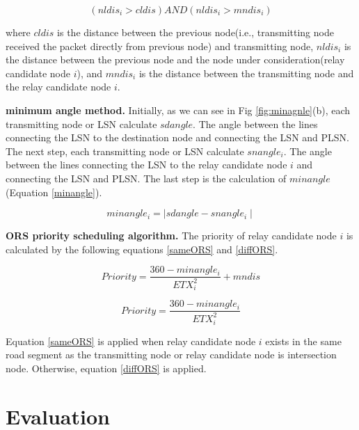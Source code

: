 \documentclass{comex}
\begin{document}
\begin{equation}
\label{potential nodes}
\left( nldis_i > cldis \right)   AND   \left( nldis_i > mndis_i \right) 
\end{equation}

where $cldis$ is the distance between the previous node(i.e., transmitting node received the packet directly from previous node) and transmitting node,
$nldis_i$ is the distance between the previous node and the node under consideration(relay candidate node $i$), and $mndis_i$ is the distance between the transmitting node and the relay candidate node $i$.


\textbf{minimum angle method.} Initially, as we can see in Fig \ref{fig:minagnle}(b), each transmitting node or LSN calculate $sdangle$. The angle between the lines connecting the LSN to the destination node and connecting the LSN and PLSN. The next step, each transmitting node or LSN calculate $snangle_i$. The angle between the lines connecting the LSN to the relay candidate node $i$  and connecting the LSN and PLSN. The last step is the calculation of  $minangle$ (Equation \ref{minangle}).

\begin{equation}
\label{minangle}
minangle_i = \mid sdangle - snangle_i \mid
\end{equation}


\textbf{ORS priority scheduling algorithm.} 
The priority of relay candidate node $i$ is calculated by the following equations \ref{sameORS} and \ref{diffORS}.


\begin{equation}
\label{sameORS}
Priority = \frac{360 - minangle_i}{ETX_{i}^{2}} + mndis
\end{equation}

\begin{equation}
\label{diffORS}
Priority = \frac{360 - minangle_i}{ETX_{i}^{2}} 
\end{equation}

Equation \ref{sameORS}  is applied when relay candidate node $i$ exists in the same road segment as the transmitting node or relay candidate node is intersection node. Otherwise, equation \ref{diffORS} is applied.



\section{Evaluation}
\end{document}
